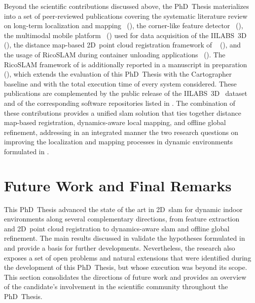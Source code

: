 Beyond the scientific contributions discussed above,
the PhD~Thesis materializes into a set of peer-reviewed publications
covering the systematic literature review on long-term localization
and mapping~\cite{sousa:jfr:2023} (), the corner-like feature
detector~\cite{sousa:icara:2024} (), the multimodal
mobile platform~\cite{sousa:icarsc:2025} ()
used for data acquisition of the IILABS~3D~\cite{ribeiro:access:2025}
(), the distance map-based 2D~point cloud registration
framework of ~\cite{sousa:robot:2026}
(), and the usage of RicoSLAM during container unloading
applications~\cite{lopes:icara:2026} ().
The RicoSLAM framework of  is additionally reported in a
manuscript in preparation~\cite{sousa:ral:2026} (),
which extends the evaluation of this PhD~Thesis with the
Cartographer~\cite{hess:icra:2016} baseline and with the total execution time
of every system considered.
These publications are complemented by
the public release of the IILABS~3D~\cite{ribeiro:access:2025}
dataset and of the corresponding software repositories listed in
. The combination of these
contributions provides a unified \gls{slam} solution that ties
together distance map-based registration,
dynamics-aware local mapping, and offline global refinement,
addressing in an integrated manner the two research questions on
improving the localization and mapping processes in dynamic environments
formulated in .

\section{Future Work and Final Remarks}\label{sec:conclusions:final-remarks}

This PhD~Thesis advanced the state of the art in 2D~\gls{slam} for
dynamic indoor environments along several complementary directions,
from feature extraction and 2D~point cloud registration to dynamics-aware
\gls{slam} and offline global refinement. The main results discussed in
 validate the hypotheses formulated in
 and provide a basis for further developments.
Nevertheless, the research also exposes a set of open problems and natural
extensions that were identified during the development of this PhD~Thesis,
but whose execution was beyond its scope. This section consolidates the
directions of future work and provides an overview of the candidate's
involvement in the scientific community throughout the PhD~Thesis.

